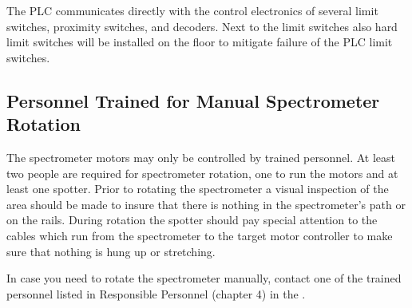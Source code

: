 The PLC communicates directly with the control electronics of several limit
switches, proximity switches, and decoders. Next to the limit switches
also hard limit switches will be installed on the floor to mitigate failure
of the PLC limit switches.


\subsection{Personnel Trained for Manual Spectrometer Rotation}

The spectrometer motors may only be controlled by trained personnel.
At least two people are required for spectrometer rotation, one to
run the motors and at least one spotter. Prior to rotating the spectrometer
a visual inspection of the area should be made to insure that there
is nothing in the spectrometer's path or on the rails. During rotation
the spotter should pay special attention to
the cables which run from the
spectrometer to the target motor controller to make sure that
nothing is hung up or stretching.

In case you need to rotate the spectrometer manually, contact one of the trained
personnel listed in Responsible Personnel (chapter 4) in
the .

